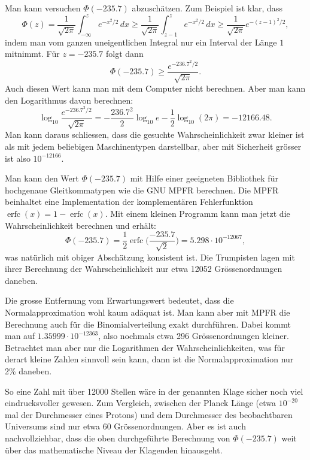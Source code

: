 \begin{diskussion}
Man kann versuchen $\Phi(-235.7)$ abzuschätzen.
Zum Beispiel ist klar, dass
\[
\Phi(z)
=
\frac{1}{\sqrt{2\pi}}
\int_{-\infty}^{z} e^{-x^2/2}\,dx
\ge
\frac{1}{\sqrt{2\pi}}
\int_{z-1}^{z} e^{-x^2/2}\,dx
\ge
\frac{1}{\sqrt{2\pi}}
e^{-(z-1)^2/2},
\]
indem man vom ganzen uneigentlichen Integral nur ein Interval der Länge $1$
mitnimmt.
Für $z=-235.7$ folgt dann
\[
\Phi(-235.7)
\ge
\frac{e^{-236.7^2/2}}{\sqrt{2\pi}}.
\]
Auch diesen Wert kann man mit dem Computer nicht berechnen.
Aber man kann den Logarithmus davon berechnen:
\[
\log_{10}
\frac{e^{-236.7^2/2}}{\sqrt{2\pi}}
=
-\frac{236.7^2}{2} \log_{10}e - \frac12 \log_{10}(2\pi)
=
-12166.48.
\]
Man kann daraus schliessen, dass die gesuchte Wahrscheinlichkeit
zwar kleiner ist als mit jedem beliebigen Maschinentypen darstellbar,
aber mit Sicherheit grösser ist also $10^{-12166}$.

Man kann den Wert $\Phi(-235.7)$ mit Hilfe einer geeigneten
Bibliothek für hochgenaue Gleitkommatypen wie die GNU MPFR
berechnen.
Die MPFR beinhaltet eine Implementation der komplementären Fehlerfunktion
$\operatorname{erfc}(x) = 1-\operatorname{erfc}(x)$.
Mit einem kleinen Programm kann man jetzt die Wahrscheinlichkeit
berechnen und erhält:
\[
\Phi(-235.7)
=
\frac12\operatorname{erfc}\biggl(\frac{-235.7}{\sqrt{2}}\biggr)
=
5.298\cdot10^{-12067},
\]
was natürlich mit obiger Abschätzung konsistent ist.
Die Trumpisten lagen mit ihrer Berechnung der Wahrscheinlichkeit
nur etwa 12052 Grössenordnungen daneben.

Die grosse Entfernung vom Erwartungswert bedeutet, dass die Normalapproximation
wohl kaum adäquat ist.
Man kann aber mit MPFR die Berechnung auch für die Binomialverteilung exakt
durchführen.
Dabei kommt man auf $1.35999\cdot 10^{-12363}$, also nochmals etwa
296 Grössenordnungen kleiner.
Betrachtet man aber nur die Logarithmen der Wahrscheinlichkeiten,
was für derart kleine Zahlen sinnvoll sein kann, dann ist die
Normalapproximation nur 2\% daneben.

So eine Zahl mit über 12000 Stellen wäre in der genannten Klage sicher
noch viel eindrucksvoller gewesen.
Zum Vergleich, zwischen der Planck Länge (etwa $10^{-20}$ mal der Durchmesser
eines Protons) und dem Durchmesser des beobachtbaren Universums sind nur
etwa 60 Grössenordnungen.
Aber es ist auch nachvollziehbar, dass die oben durchgeführte Berechnung
von $\Phi(-235.7)$ weit über das mathematische Niveau der Klagenden
hinausgeht.
\end{diskussion}




